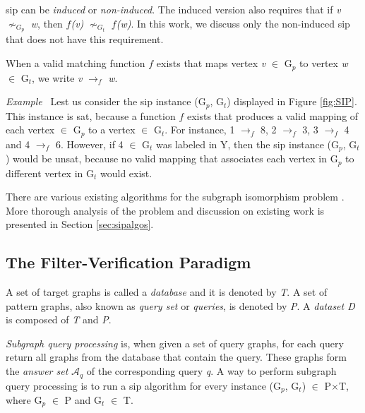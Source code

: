 \documentclass{l4proj}
\newcounter{example}[section]
\newenvironment{example}[1][]{\refstepcounter{example}\par\medskip
   \noindent \textit{Example~\theexample #1} \rmfamily}{\medskip}
\newcommand{\fancyA}{\mathcal{A}}
\begin{document}
\gls{sip} can be \emph{induced} or \emph{non-induced}. The induced version also requires that if \emph{v} $\nsim_{G_{p}}$ \emph{w}, then \emph{$f$(v)} $\nsim_{G_{t}}$ \emph{$f$(w)}. In this work, we discuss only the non-induced \gls{sip} that does not have this requirement.

When a valid matching function $f$ exists that maps vertex \emph{v} $\in$ G$_{p}$ to vertex \emph{w} $\in$ G$_{t}$, we write \emph{v} $\rightarrow_{f}$ \emph{w}. 

\begin{example}
Lest us consider the \gls{sip} instance (G$_{p}$, G$_{t}$) displayed in Figure \ref{fig:SIP}. This instance is \gls{sat}, because a function $f$ exists that produces a valid mapping of each vertex $\in$ G$_{p}$ to a vertex $\in$ G$_{t}$. For instance, 1 $\rightarrow_{f}$ 8, 2 $\rightarrow_{f}$ 3, 3 $\rightarrow_{f}$ 4 and 4 $\rightarrow_{f}$ 6. However, if 4 $\in$ G$_{t}$ was labeled in Y, then the \gls{sip} instance (G$_{p}$, G$_{t}$) would be \gls{unsat}, because no valid mapping that associates each vertex in G$_{p}$ to different vertex in G$_{t}$ would exist.
\end{example}

There are various existing algorithms for the subgraph isomorphism problem \cite{vf2,Solnon:2010,CP2015,Larrosa:2002,Bonnici:2013,Zampelli:2010,nauty}. More thorough analysis of the problem and discussion on existing work is presented in Section \ref{sec:sipalgos}.

\subsection{The Filter-Verification Paradigm}
A set of target graphs is called a \emph{database} and it is denoted by \emph{T}. A set of pattern graphs, also known as \emph{query set} or \emph{queries}, is denoted by \emph{P}. A \emph{dataset D} is composed of \emph{T} and \emph{P}. 

\textit{Subgraph query processing} is, when given a set of query graphs, for each query return all graphs from the database that contain the query. These graphs form the \emph{answer set} $\fancyA_{q}$ of the corresponding query \emph{q}. A way to perform subgraph query processing is to run a \gls{sip} algorithm for every instance (G$_{p}$, G$_{t}$) $\in$ P$\times$T, where G$_{p}$ $\in$ P and G$_{t}$ $\in$ T.
\end{document}
